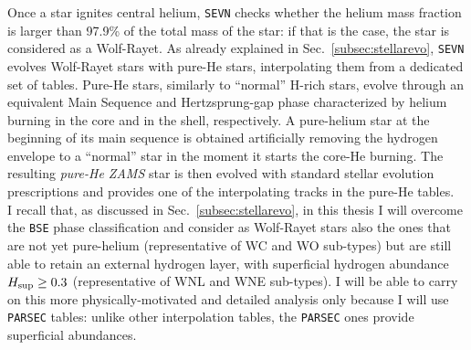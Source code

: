 \documentclass[a4paper,titlepage]{book}     	%
\begin{document}
Once a star ignites central helium, \texttt{SEVN} checks whether the helium mass fraction is larger than 97.9\% of the total mass of the star: if that is the case, the star is considered as a Wolf-Rayet. As already explained in Sec.\ \ref{subsec:stellarevo}, \texttt{SEVN} evolves Wolf-Rayet stars with pure-He stars, interpolating them from a dedicated set of tables. Pure-He stars, similarly to ``normal'' H-rich stars, evolve through an equivalent Main Sequence and Hertzsprung-gap phase characterized by helium burning in the core and in the shell, respectively. A pure-helium star at the beginning of its main sequence is obtained artificially removing the hydrogen envelope to a ``normal'' star in the moment it starts the core-He burning. The resulting \emph{pure-He ZAMS} star is then evolved with standard stellar evolution prescriptions and provides one of the interpolating tracks in the pure-He tables.\\

I recall that, as discussed in Sec.\ \ref{subsec:stellarevo}, in this thesis I will overcome the \texttt{BSE} phase classification and consider as Wolf-Rayet stars also the ones that are not yet pure-helium (representative of WC and WO sub-types) but are still able to retain an external hydrogen layer, with superficial hydrogen abundance $H_{\rm sup} \geq 0.3$ (representative of WNL and WNE sub-types). I will be able to carry on this more physically-motivated and detailed analysis only because I will use \texttt{PARSEC} tables: unlike other interpolation tables, the \texttt{PARSEC} ones provide superficial abundances.
\end{document}
